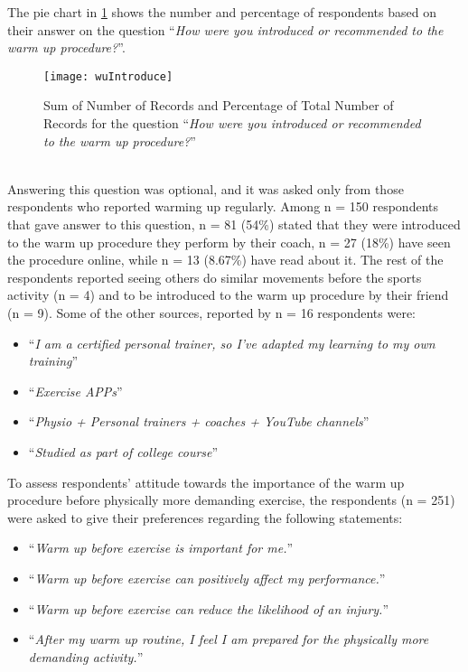 The pie chart in \ref{fig:wuIntroduce} shows the number and percentage of respondents based on their answer on the question ``\textit{How were you introduced or recommended to the warm up procedure?}''.
\begin{figure}[h]
    \centering
    \texttt{[image: wuIntroduce]}
    \caption{Sum of Number of Records and Percentage of Total Number of Records for the question ``\textit{How were you introduced or recommended to the warm up procedure?}''}
    \label{fig:wuIntroduce}
\end{figure}\\
Answering this question was optional, and it was asked only from those respondents who reported warming up regularly. Among n = 150 respondents that gave answer to this question, n = 81 (54\%) stated that they were introduced to the warm up procedure they perform by their coach, n = 27 (18\%) have seen the procedure online, while n = 13 (8.67\%) have read about it. The rest of the respondents reported seeing others do similar movements before the sports activity (n = 4) and to be introduced to the warm up procedure by their friend (n = 9). Some of the other sources, reported by n = 16 respondents were:
\begin{itemize}
\item ``\textit{I am a certified personal trainer, so I've adapted my learning to my own training}''
\item  ``\textit{Exercise APPs}''
\item  ``\textit{Physio + Personal trainers + coaches + YouTube channels}''
\item  ``\textit{Studied as part of college course}''
\end{itemize}
To assess respondents' attitude towards the importance of the warm up procedure before physically more demanding exercise, the respondents (n = 251) were asked to give their preferences regarding the following statements: 
\begin{itemize}
\item ``\textit{Warm up before exercise is important for me.}''
\item  ``\textit{Warm up before exercise can positively affect my performance.}''
\item  ``\textit{Warm up before exercise can reduce the likelihood of an injury.}''
\item  ``\textit{After my warm up routine, I feel I am prepared for the physically more demanding activity.}''
\end{itemize}
